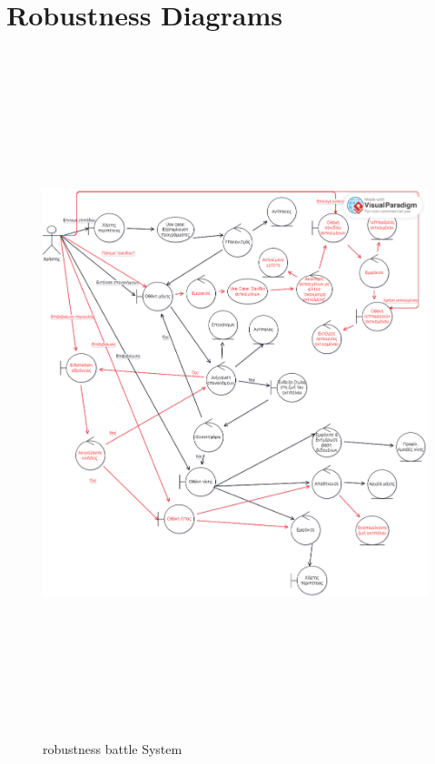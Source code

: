 \section{Robustness Diagrams}
\begin{figure}[!htb]
  \centering
    \centering
    \includegraphics[width=19cm,height=20cm]{robust_battle_system.png}
    \caption{robustness battle System}
    \label{}
\end{figure}
